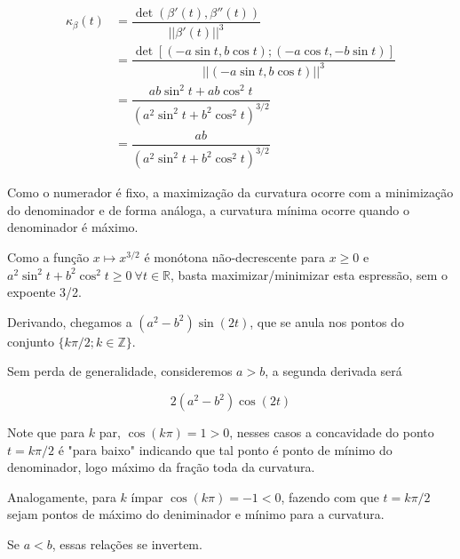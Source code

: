 \documentclass[12pt,letterpaper]{article}
\begin{document}
\begin{enumerate}
		\begin{align*}
			\kappa_{\beta}(t)&=\dfrac{\det(\beta'(t),\beta''(t))}{||\beta'(t)||^3}\\
			&=\dfrac{\det[(-a\sin t,b\cos t);(-a\cos t,-b\sin t)]}{||(-a\sin t,b\cos t)||^3}\\
			&=\dfrac{ab\sin^2t+ab\cos^2t}{(a^2\sin^2t+b^2\cos^2t)^{3/2}}\\
			&=\dfrac{ab}{(a^2\sin^2t+b^2\cos^2t)^{3/2}}
		\end{align*}
		
		Como o numerador é fixo, a maximização da curvatura ocorre com a minimização do denominador e de forma análoga, a curvatura mínima ocorre quando o denominador é máximo.
		
		Como a função $x\mapsto x^{3/2}$ é monótona não-decrescente para $x\geq0$ e $a^2\sin^2t+b^2\cos^2t\geq0~\forall t \in\mathbb{R}$, basta maximizar/minimizar esta espressão, sem o expoente 3/2.
		
		Derivando, chegamos a $(a^2 - b^2) \sin(2 t)$, que se anula nos pontos do conjunto $\{k\pi/2;k\in\mathbb{Z}\}$.
		
		Sem perda de generalidade, consideremos $a>b$, a segunda derivada será 
		
		$$2(a^2-b^2)\cos(2t)$$
		
		Note que para $k$ par, $\cos(k\pi)=1>0$, nesses casos a concavidade do ponto $t=k\pi/2$ é "para baixo" indicando que tal ponto é ponto de mínimo do denominador, logo máximo da fração toda da curvatura.
		
		Analogamente, para $k$ ímpar $\cos(k\pi)=-1<0$, fazendo com que $t=k\pi/2$ sejam pontos de máximo do deniminador e mínimo para a curvatura.
		
		Se $a<b$, essas relações se invertem.
		

\end{enumerate}
\end{document}
